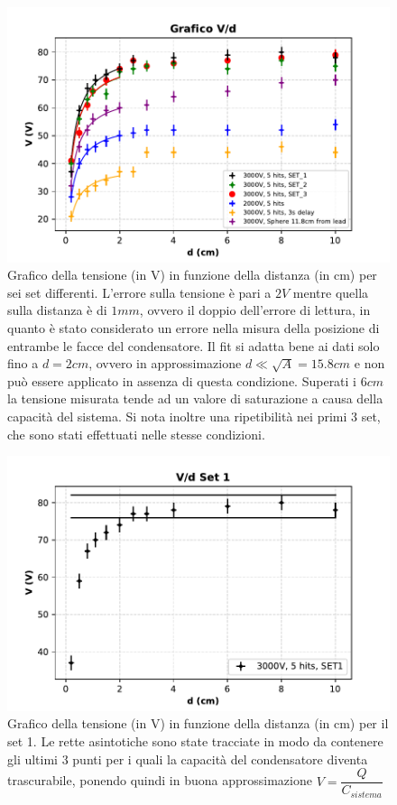 {\fontsize{12}{14}\selectfont 
\begin{figure}[H]
  \centering
  \includegraphics[width=14.5cm]{Figures/Grafico_Parte1.pdf}
  \caption{Grafico della tensione (in V) in funzione della distanza (in cm) per sei set differenti. L'errore sulla tensione è pari a $2 V$ mentre quella sulla distanza è di $1 mm$, ovvero il doppio dell'errore di lettura, in quanto è stato considerato un errore nella misura della posizione di entrambe le facce del condensatore. Il fit si adatta bene ai dati solo fino a $d = 2 cm$, ovvero in approssimazione $d \ll \sqrt{A} = 15.8 cm$ e non può essere applicato in assenza di questa condizione. Superati i $6cm$ la tensione misurata tende ad un valore di saturazione a causa della capacità del sistema. Si nota inoltre una ripetibilità nei primi 3 set, che sono stati effettuati nelle stesse condizioni.}
  \label{fig:GraficoParteI}
\end{figure}

\begin{figure}[H]
  \centering
  \includegraphics[width=11.5cm]{Figures/Grafico_Parte1_SET1.pdf}
  \caption{Grafico della tensione (in V) in funzione della distanza (in cm) per il set 1. Le rette asintotiche sono state tracciate in modo da contenere gli ultimi 3 punti per i quali la capacità del condensatore diventa trascurabile, ponendo quindi in buona approssimazione $V = \dfrac{Q}{C_{sistema}}$}
  \label{fig:parteIset1}
\end{figure}

}
